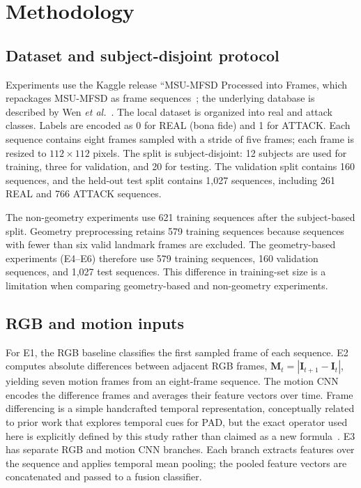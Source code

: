 \documentclass[a4paper,conference]{IEEEtran}
\begin{document}
\section{Methodology}
\subsection{Dataset and subject-disjoint protocol}
Experiments use the Kaggle release ``MSU-MFSD Processed into Frames, which repackages MSU-MFSD as frame sequences~\cite{kagglemsumfsd}; the underlying database is described by Wen \emph{et al.}~\cite{wen2015ida}. The local dataset is organized into real and attack classes. Labels are encoded as 0 for REAL (bona fide) and 1 for ATTACK. Each sequence contains eight frames sampled with a stride of five frames; each frame is resized to $112\times112$ pixels. The split is subject-disjoint: 12 subjects are used for training, three for validation, and 20 for testing. The validation split contains 160 sequences, and the held-out test split contains 1,027 sequences, including 261 REAL and 766 ATTACK sequences.

The non-geometry experiments use 621 training sequences after the subject-based split. Geometry preprocessing retains 579 training sequences because sequences with fewer than six valid landmark frames are excluded. The geometry-based experiments (E4--E6) therefore use 579 training sequences, 160 validation sequences, and 1,027 test sequences. This difference in training-set size is a limitation when comparing geometry-based and non-geometry experiments.

\subsection{RGB and motion inputs}
For E1, the RGB baseline classifies the first sampled frame of each sequence. E2 computes absolute differences between adjacent RGB frames, $\mathbf{M}_t=|\mathbf{I}_{t+1}-\mathbf{I}_t|$, yielding seven motion frames from an eight-frame sequence. The motion CNN encodes the difference frames and averages their feature vectors over time. Frame differencing is a simple handcrafted temporal representation, conceptually related to prior work that explores temporal cues for PAD, but the exact operator used here is explicitly defined by this study rather than claimed as a new formula~\cite{yang2019stasn,sun2018temporal}. E3 has separate RGB and motion CNN branches. Each branch extracts features over the sequence and applies temporal mean pooling; the pooled feature vectors are concatenated and passed to a fusion classifier.
\end{document}
